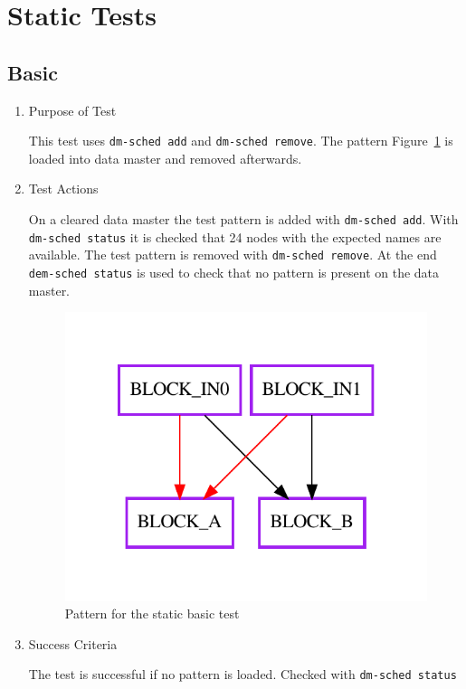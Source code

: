\documentclass[12pt,a4paper]{report}
\begin{document}
\section{Static Tests}
\subsection{Basic}
\begin{enumerate}
	\item Purpose of Test

	This test uses \texttt{dm-sched add} and \texttt{dm-sched remove}. The pattern Figure~\ref{fig:Pattern_for_the_static_basic_test} 
	is loaded into data master and removed afterwards.
	\item Test Actions

	On a cleared data master the test pattern is added with \texttt{dm-sched add}. With \texttt{dm-sched status} it is checked that 24 nodes with the expected names are available. The test pattern is removed with \texttt{dm-sched remove}. At the end \texttt{dem-sched status} is used to check that no pattern is present on the data master.

    \begin{figure}
        \centering 
        \includegraphics{TestPattern/static_basic.pdf}
        \caption{Pattern for the static basic test}
        \label{fig:Pattern_for_the_static_basic_test}
    \end{figure}
	\item Success Criteria

	The test is successful if no pattern is loaded. Checked with \texttt{dm-sched status}
\end{enumerate}
\end{document}
